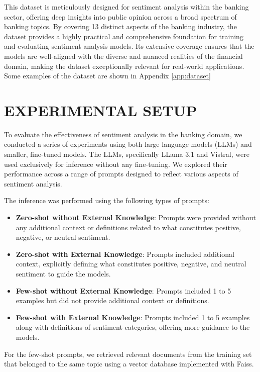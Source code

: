 {This dataset is meticulously designed for sentiment analysis within the banking sector, offering deep insights into public opinion across a broad spectrum of banking topics. By covering 13 distinct aspects of the banking industry, the dataset provides a highly practical and comprehensive foundation for training and evaluating sentiment analysis models. Its extensive coverage ensures that the models are well-aligned with the diverse and nuanced realities of the financial domain, making the dataset exceptionally relevant for real-world applications. Some examples of the dataset are shown in Appendix \ref{app:dataset}

\section{EXPERIMENTAL SETUP}
To evaluate the effectiveness of sentiment analysis in the banking domain, we conducted a series of experiments using both large language models (LLMs) and smaller, fine-tuned models. The LLMs, specifically LLama 3.1 and Vistral, were used exclusively for inference without any fine-tuning. We explored their performance across a range of prompts designed to reflect various aspects of sentiment analysis.

The inference was performed using the following types of prompts:
\begin{itemize}
  \item\textbf{Zero-shot without External Knowledge}: Prompts were provided without any additional context or definitions related to what constitutes positive, negative, or neutral sentiment.
  \item\textbf{Zero-shot with External Knowledge}: Prompts included additional context, explicitly defining what constitutes positive, negative, and neutral sentiment to guide the models.
  \item\textbf{Few-shot without External Knowledge}: Prompts included 1 to 5 examples but did not provide additional context or definitions.
  \item\textbf{Few-shot with External Knowledge}: Prompts included 1 to 5 examples along with definitions of sentiment categories, offering more guidance to the models.
\end{itemize}

For the few-shot prompts, we retrieved relevant documents from the training set that belonged to the same topic using a vector database implemented with Faiss\cite{douze2024faiss}.

}
